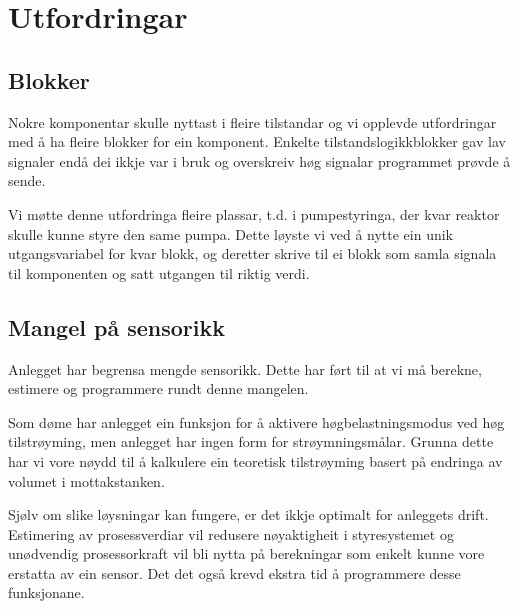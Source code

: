 \section{Utfordringar}
\thispagestyle{fancy}

\subsection{Blokker}
Nokre komponentar skulle nyttast i fleire tilstandar og vi opplevde 
utfordringar med å ha fleire blokker for ein komponent.
Enkelte tilstandslogikkblokker gav lav signaler endå dei ikkje var i bruk og 
overskreiv høg signalar programmet prøvde å sende.

Vi møtte denne utfordringa fleire plassar, t.d. i pumpestyringa,
der kvar reaktor skulle kunne styre den same pumpa.
Dette løyste vi ved å nytte ein unik utgangsvariabel for kvar blokk, 
og deretter skrive til ei blokk som samla signala til komponenten og satt utgangen til riktig verdi.

\subsection{Mangel på sensorikk}

Anlegget har begrensa mengde sensorikk. 
Dette har ført til at vi må berekne, estimere og programmere rundt denne mangelen.

Som døme har anlegget ein funksjon for å aktivere
høgbelastningsmodus ved høg tilstrøyming, 
men anlegget har ingen form for strøymningsmålar.\newline
Grunna dette har vi vore nøydd til å kalkulere ein teoretisk tilstrøyming basert på endringa av volumet i mottakstanken.

Sjølv om slike løysningar kan fungere, er det ikkje optimalt for anleggets drift.
Estimering av prosessverdiar vil redusere nøyaktigheit i styresystemet og
unødvendig prosessorkraft vil bli nytta på berekningar som enkelt kunne vore erstatta av ein sensor.\newline
Det det også krevd ekstra tid å programmere desse funksjonane.


